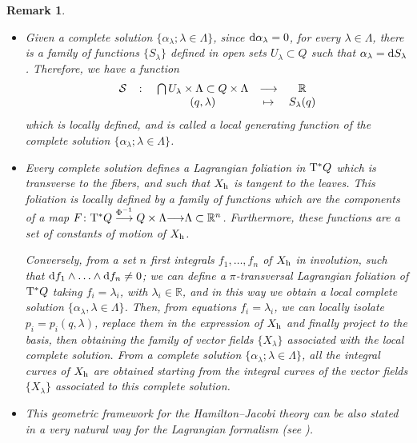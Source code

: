 \documentclass[12pt]{report}
\newtheorem{remark}[teor]{Remark}
\def\bit{\begin{itemize}}
\def\eit{\end{itemize}}
\def\d{{\rm d}}
\def\Real{\mathbb{R}}
\def\Tan{{\rm T}}
\begin{document}
\begin{remark}{\rm 
\bit
\item
Given a complete solution $\{ \alpha_\lambda; \lambda\in\Lambda\}$,
since $\d\alpha_\lambda=0$, for every $\lambda\in\Lambda$, 
there is a family of functions $\{ S_\lambda\}$ defined in 
open sets $U_\lambda\subset Q$ such that $\alpha_\lambda=\d S_\lambda$.
Therefore, we have a function
$$
\begin{array}{ccccc}
{\cal S} & \colon &\bigcap U_\lambda\times\Lambda\subset Q\times\Lambda & \longrightarrow & \Real \\
 & & (q,\lambda) & \mapsto & S_\lambda(q)
\end{array}
$$
which is locally defined, and is called a {\sl local generating function} of the 
complete solution $\{ \alpha_\lambda; \lambda\in\Lambda\}$.
\item
Every complete solution defines a Lagrangian foliation in $\Tan^*Q$
which is  transverse to the fibers,
and such that $X_{\rm h}$ is tangent to the leaves.
This foliation is locally defined by a family of functions which are the components of a map
$F\colon \Tan^*Q\stackrel{\Phi^{-1}}{\longrightarrow} Q\times\Lambda 
{\longrightarrow} \Lambda\subset\Real^n$.
Furthermore, these functions are a set of constants of motion of $X_{\rm h}$.

Conversely, from a set  $n$ first integrals $f_1,\ldots,f_n$ 
of $X_{\rm h}$ in involution, such that $\d f_1\wedge\ldots\wedge \d f_n\not=0$;
we can define a $\pi$-transversal Lagrangian foliation of $\Tan^*Q$
taking $f_i=\lambda_i$, with $\lambda_i\in\Real$,
and in this way we obtain a local complete solution $\{\alpha_\lambda,\lambda\in\Lambda\}$.
Then, from equations $f_i=\lambda_i$, we can  locally isolate
$p_i=p_i(q,\lambda)$, replace them in the expression of $X_{\rm h}$
and finally project to the basis, then obtaining the family of vector fields 
$\{X_\lambda\}$ associated with the local complete solution.
From a complete solution $\{ \alpha_\lambda;\lambda\in\Lambda\}$,
all the integral curves of  $X_{\rm h}$ are obtained starting from
the integral curves of the vector fields $\{ X_\lambda\}$
associated to this complete solution.
\item
This geometric framework for the Hamilton--Jacobi theory 
can be also stated in a very natural way for the Lagrangian formalism
(see \cite{CGMMR-06}).
\eit
}\end{remark}
\end{document}
